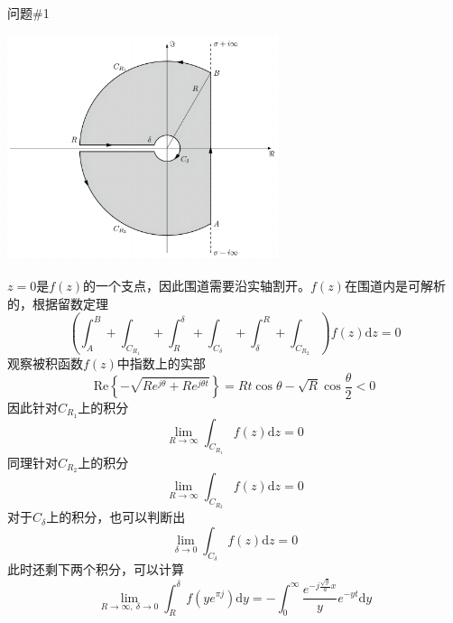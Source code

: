 \documentclass[12pt]{ctexart}
\begin{document}
    \begin{problem}{问题\#1}
        \begin{center}
            \includegraphics[width=8cm]{fig1.png}
        \end{center}
        $z=0$是$f(z)$的一个支点，因此围道需要沿实轴割开。$f(z)$在围道内是可解析的，根据留数定理
        $$
        \left(\int^{B}_{A}+\int_{C_{R_{1}}}+\int^{\delta}_{R}+\int_{C_{\delta}}+\int^{R}_{\delta}+\int_{C_{R_{2}}}\right)f(z)\mathrm{d}z=0
        $$
        观察被积函数$f(z)$中指数上的实部
        $$
        \mathrm{Re} \left\{-\sqrt{Re^{j\theta}+Re^{j\theta t}}\right\}=Rt\cos\theta-\sqrt{R}\cos\dfrac{\theta}{2}<0
        $$
        因此针对$C_{R_1}$上的积分
        $$
        \lim_{R\to\infty}\int_{C_{R_{1}}}f(z)\mathrm{d}z=0
        $$
        同理针对$C_{R_2}$上的积分
        $$
        \lim_{R\to\infty}\int_{C_{R_{2}}}f(z)\mathrm{d}z=0
        $$
        对于$C_\delta$上的积分，也可以判断出
        $$
        \lim_{\delta\to0}\int_{C_{\delta}}f(z)\mathrm{d}z=0
        $$
        此时还剩下两个积分，可以计算
        $$
        \lim_{R\to\infty,\ \delta\to0
            }
                \int^{\delta}_{R}f(ye^{\pi j})\mathrm{d}y=
                -\int^{\infty}_{0}\dfrac{e^{-j\frac{\sqrt{y}}{a}x}}{y}e^{-yt}\mathrm{d}y
        $$
    \end{problem}
\end{document}
